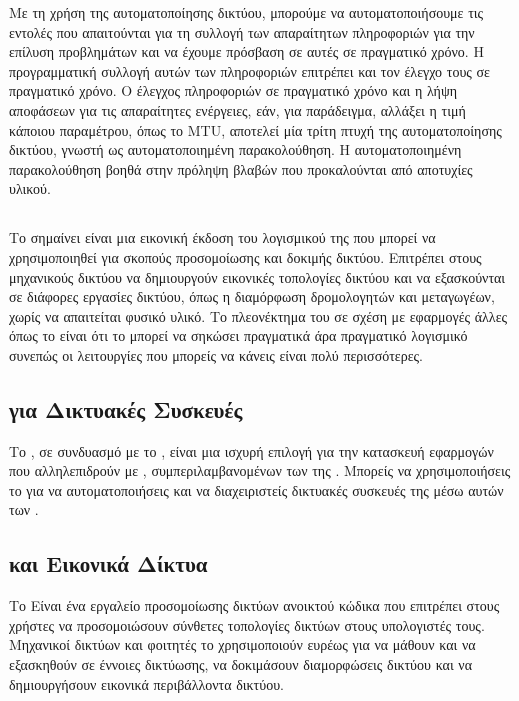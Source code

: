 Με τη χρήση της αυτοματοποίησης δικτύου, μπορούμε να αυτοματοποιήσουμε τις εντολές που απαιτούνται για τη 
συλλογή των απαραίτητων πληροφοριών για την επίλυση προβλημάτων και να έχουμε πρόσβαση σε αυτές σε πραγματικό χρόνο.
Η προγραμματική συλλογή αυτών των πληροφοριών επιτρέπει και τον έλεγχο τους σε πραγματικό χρόνο. Ο έλεγχος πληροφοριών σε πραγματικό χρόνο και η λήψη αποφάσεων για τις απαραίτητες ενέργειες, εάν, για παράδειγμα, αλλάξει η τιμή κάποιου παραμέτρου, όπως το MTU, αποτελεί μία τρίτη πτυχή της αυτοματοποίησης δικτύου, γνωστή ως αυτοματοποιημένη παρακολούθηση. Η αυτοματοποιημένη παρακολούθηση βοηθά στην πρόληψη βλαβών που προκαλούνται από αποτυχίες υλικού.



\subsection{}
Το  σημαίνει  είναι μια εικονική έκδοση του λογισμικού  της  που 
μπορεί να χρησιμοποιηθεί για σκοπούς προσομοίωσης και δοκιμής δικτύου. Επιτρέπει στους μηχανικούς δικτύου να δημιουργούν εικονικές τοπολογίες δικτύου και να εξασκούνται σε διάφορες εργασίες δικτύου, 
όπως η διαμόρφωση δρομολογητών και μεταγωγέων, χωρίς να απαιτείται φυσικό υλικό. Το πλεονέκτημα του  σε σχέση με εφαρμογές άλλες όπως το  είναι ότι το  
μπορεί να σηκώσει πραγματικά  άρα πραγματικό λογισμικό συνεπώς οι λειτουργίες που μπορείς να κάνεις είναι πολύ περισσότερες.


\subsection{ για Δικτυακές Συσκευές }
Το , σε συνδυασμό με το , είναι μια ισχυρή επιλογή για την κατασκευή  
εφαρμογών που αλληλεπιδρούν με , συμπεριλαμβανομένων των  της . Μπορείς να χρησιμοποιήσεις το  
για να αυτοματοποιήσεις και να διαχειριστείς δικτυακές συσκευές της  μέσω αυτών των .


\subsection{ και Εικονικά Δίκτυα}

Το  Είναι ένα εργαλείο προσομοίωσης δικτύων ανοικτού κώδικα που επιτρέπει στους χρήστες να προσομοιώσουν 
σύνθετες τοπολογίες δικτύων στους υπολογιστές τους. Μηχανικοί δικτύων και φοιτητές 
το χρησιμοποιούν ευρέως για να μάθουν και να εξασκηθούν σε έννοιες δικτύωσης, να δοκιμάσουν διαμορφώσεις δικτύου και να δημιουργήσουν εικονικά περιβάλλοντα δικτύου.


